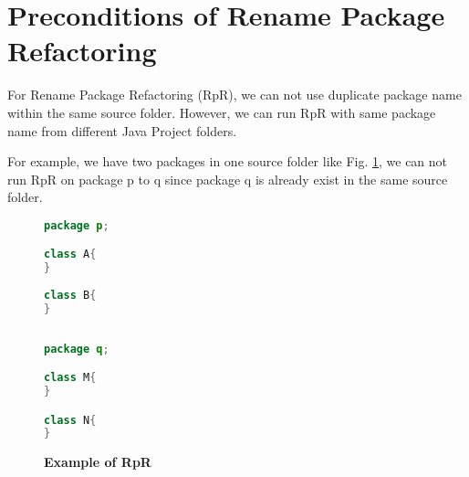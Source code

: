  \section{\textbf{Preconditions of Rename Package Refactoring}}

For Rename Package Refactoring (RpR), we can not use duplicate package name within the same source folder. However, we can run RpR with same package name from different Java Project folders.

For example, we have two packages in one source folder like Fig. \ref{fig:RpR}, we can not run RpR on package p to q since package q is already exist in the same source folder. 

\begin{figure}[th]
\centering
\begin{minipage}[t]{0.45\linewidth}
\begin{lstlisting}[language=java, basicstyle=\scriptsize\ttfamily,frame=single]
package p;

class A{
}
	
class B{
}
 
\end{lstlisting}
\end{minipage}
\hfill
\begin{minipage}[t]{0.45\linewidth}
\begin{lstlisting}[language=java, basicstyle=\scriptsize\ttfamily,frame=single]
package q;

class M{
}	

class N{
}


\end{lstlisting}
\end{minipage}
\caption{\textbf{Example of RpR}}
\label{fig:RpR}
\end{figure}